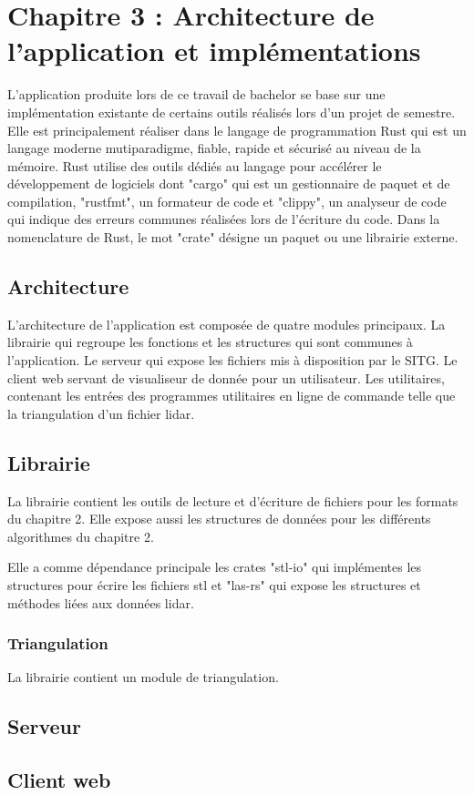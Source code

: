 \chapter{Chapitre 3 : Architecture de l'application et implémentations}

L'application produite lors de ce travail de bachelor se base sur une implémentation existante de certains outils réalisés lors d'un projet de semestre. Elle est principalement réaliser dans le langage de programmation Rust qui est un langage moderne mutiparadigme, fiable, rapide et sécurisé au niveau de la mémoire. Rust utilise des outils dédiés au langage pour accélérer le développement de logiciels dont "cargo" qui est un gestionnaire de paquet et de compilation, "rustfmt", un formateur de code et "clippy", un analyseur de code qui indique des erreurs communes réalisées lors de l'écriture du code. Dans la nomenclature de Rust, le mot "crate" désigne un paquet ou une librairie externe.

\section{Architecture}
L'architecture de l'application est composée de quatre modules principaux.
La librairie qui regroupe les fonctions et les structures qui sont communes à l'application.
Le serveur qui expose les fichiers mis à disposition par le \gls{SITG}.
Le client web servant de visualiseur de donnée pour un utilisateur.
Les utilitaires, contenant les entrées des programmes utilitaires en ligne de commande telle que la triangulation d'un fichier lidar.

\section{Librairie}

La librairie contient les outils de lecture et d'écriture de fichiers pour les formats du chapitre 2. Elle expose aussi les structures de données pour les différents algorithmes du chapitre 2.

Elle a comme dépendance principale les crates "stl-io" qui implémentes les structures pour écrire les fichiers \gls{stl} et "las-rs" qui expose les structures et méthodes liées aux données lidar.

\subsection{Triangulation}
La librairie contient un module de triangulation.

\section{Serveur}
\section{Client web}
